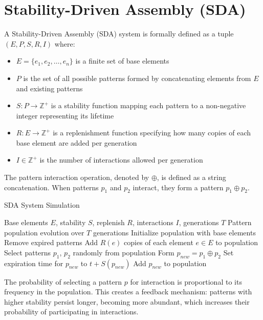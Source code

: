\documentclass[life,article,submit,pdftex,moreauthors]{Definitions/mdpi}
\begin{document}
\section{Stability-Driven Assembly (SDA)}

A Stability-Driven Assembly (SDA) \cite{adler_sda} system is formally defined as a tuple $(E, P, S, R, I)$ where:
\begin{itemize}
   \item $E = \{e_1, e_2, \ldots, e_n\}$ is a finite set of base elements
   \item $P$ is the set of all possible patterns formed by concatenating elements from $E$ and existing patterns
   \item $S: P \rightarrow \mathbb{Z}^{+}$ is a stability function mapping each pattern to a non-negative integer representing its lifetime
   \item $R: E \rightarrow \mathbb{Z}^{+}$ is a replenishment function specifying how many copies of each base element are added per generation
   \item $I \in \mathbb{Z}^{+}$ is the number of interactions allowed per generation
\end{itemize}

The pattern interaction operation, denoted by $\oplus$, is defined as a string concatenation. When patterns $p_1$ and $p_2$ interact, they form a pattern $p_1 \oplus p_2$.

\begin{algorithm}[H]
\caption{SDA System Simulation}
\begin{algorithmic}[1]
\REQUIRE Base elements $E$, stability $S$, replenish $R$, interactions $I$, generations $T$
\ENSURE Pattern population evolution over $T$ generations
\STATE Initialize population with base elements
   \STATE Remove expired patterns
   \STATE Add $R(e)$ copies of each element $e \in E$ to population
       \STATE Select patterns $p_1$, $p_2$ randomly from population
       \STATE Form $p_{new} = p_1 \oplus p_2$
       \STATE Set expiration time for $p_{new}$ to $t + S(p_{new})$
       \STATE Add $p_{new}$ to population
   \ENDFOR
\ENDFOR
\end{algorithmic}
\end{algorithm}


The probability of selecting a pattern $p$ for interaction is proportional to its frequency in the population. This creates a feedback mechanism: patterns with higher stability persist longer, becoming more abundant, which increases their probability of participating in interactions.
\end{document}
